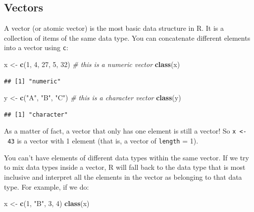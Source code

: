 \documentclass[
]{book}
\newenvironment{Shaded}{\begin{snugshade}}{\end{snugshade}}
\newcommand{\CommentTok}[1]{\textcolor[rgb]{0.56,0.35,0.01}{\textit{#1}}}
\newcommand{\DecValTok}[1]{\textcolor[rgb]{0.00,0.00,0.81}{#1}}
\newcommand{\FunctionTok}[1]{\textcolor[rgb]{0.13,0.29,0.53}{\textbf{#1}}}
\newcommand{\NormalTok}[1]{#1}
\newcommand{\OtherTok}[1]{\textcolor[rgb]{0.56,0.35,0.01}{#1}}
\newcommand{\StringTok}[1]{\textcolor[rgb]{0.31,0.60,0.02}{#1}}
\begin{document}
\hypertarget{vectors}{%
\subsection{Vectors}\label{vectors}}

A vector (or atomic vector) is the most basic data structure in R. It is a
collection of items of the same data type. You can concatenate different elements
into a vector using \texttt{c}:

\begin{Shaded}
\begin{Highlighting}[]
\NormalTok{x }\OtherTok{\textless{}{-}} \FunctionTok{c}\NormalTok{(}\DecValTok{1}\NormalTok{, }\DecValTok{4}\NormalTok{, }\DecValTok{27}\NormalTok{, }\DecValTok{5}\NormalTok{, }\DecValTok{32}\NormalTok{) }\CommentTok{\# this is a numeric vector}
\FunctionTok{class}\NormalTok{(x)}
\end{Highlighting}
\end{Shaded}

\begin{verbatim}
## [1] "numeric"
\end{verbatim}

\begin{Shaded}
\begin{Highlighting}[]
\NormalTok{y }\OtherTok{\textless{}{-}} \FunctionTok{c}\NormalTok{(}\StringTok{"A"}\NormalTok{, }\StringTok{"B"}\NormalTok{, }\StringTok{"C"}\NormalTok{) }\CommentTok{\# this is a character vector}
\FunctionTok{class}\NormalTok{(y)}
\end{Highlighting}
\end{Shaded}

\begin{verbatim}
## [1] "character"
\end{verbatim}

As a matter of fact, a vector that only has one element is still a vector! So
\texttt{x\ \textless{}-\ 43} is a vector with 1 element (that is, a vector of \texttt{length} = 1).

You can't have elements of different data types within the same vector.
If we try to mix data types inside a vector, R will fall back to the data type
that is most inclusive and interpret all the elements in the vector as belonging
to that data type. For example, if we do:

\begin{Shaded}
\begin{Highlighting}[]
\NormalTok{x }\OtherTok{\textless{}{-}} \FunctionTok{c}\NormalTok{(}\DecValTok{1}\NormalTok{, }\StringTok{"B"}\NormalTok{, }\DecValTok{3}\NormalTok{, }\DecValTok{4}\NormalTok{)}
\FunctionTok{class}\NormalTok{(x)}
\end{Highlighting}
\end{Shaded}
\end{document}
